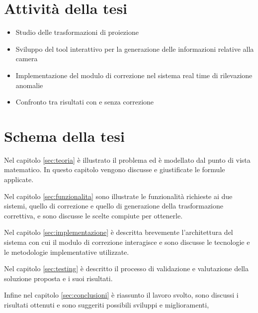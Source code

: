 \section{Attività della tesi}

\begin{itemize}
	\item Studio delle trasformazioni di proiezione
	\item Sviluppo del tool interattivo per la generazione delle informazioni relative alla camera
	\item Implementazione del modulo di correzione nel sistema real time di rilevazione anomalie
	\item Confronto tra risultati con e senza correzione
\end{itemize}

\section{Schema della tesi}

Nel capitolo \ref{sec:teoria} è illustrato il problema ed è modellato dal punto di vista matematico. In questo capitolo vengono discusse e giustificate le formule applicate.

Nel capitolo \ref{sec:funzionalita} sono illustrate le funzionalità richieste ai due sistemi, quello di correzione e quello di generazione della trasformazione correttiva, e sono discusse le scelte compiute per ottenerle.

Nel capitolo \ref{sec:implementazione} è descritta brevemente l'architettura del sistema con cui il modulo di correzione interagisce e sono discusse le tecnologie e le metodologie implementative utilizzate.

Nel capitolo \ref{sec:testing} è descritto il processo di validazione e valutazione della soluzione proposta e i suoi risultati.

Infine nel capitolo \ref{sec:conclusioni} è riassunto il lavoro svolto, sono discussi i risultati ottenuti e sono suggeriti possibili sviluppi e miglioramenti,
